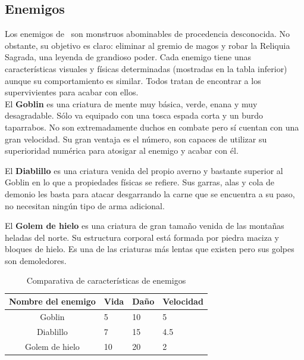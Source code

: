 \documentclass[a4paper,11pt]{article}
\begin{document}
\subsection{Enemigos}

Los enemigos de \juego\ son monstruos abominables de procedencia desconocida.
No obstante, su objetivo es claro: eliminar al gremio de magos y robar la
Reliquia Sagrada, una leyenda de grandioso poder. Cada enemigo tiene unas
características visuales y físicas determinadas (mostradas en la tabla inferior)
aunque su comportamiento es similar. Todos tratan de encontrar a los supervivientes
para acabar con ellos.\\

El \textbf{Goblin} es una criatura de mente muy básica, verde, enana y 
muy desagradable. Sólo va equipado con una tosca espada corta y un burdo
taparrabos. No son extremadamente duchos en combate pero sí cuentan con una
gran velocidad. Su gran ventaja es el número, son capaces de utilizar su
superioridad numérica para atosigar al enemigo y acabar con él. 


El \textbf{Diablillo} es una criatura venida del propio averno y bastante
superior al Goblin en lo que a propiedades físicas se refiere. Sus garras, alas
y cola de demonio les basta para atacar desgarrando la carne que se encuentra
a su paso, no necesitan ningún tipo de arma adicional.


El \textbf{Golem de hielo} es una criatura de gran tamaño venida de las
montañas heladas del norte. Su estructura corporal está formada por piedra
maciza y bloques de hielo. Es una de las criaturas más lentas que existen
pero sus golpes son demoledores.


\begin{table}[H]
  \label{caracteristicas-enemigos}
  \begin{center}
  \begin{tabular}{| c ||m{2cm}|m{2cm}|m{2cm}|}
    \hline
    Nombre del enemigo & Vida & Daño & Velocidad \\
    \hline
    Goblin & 5 & 10 & 5 \\
    \hline
    Diablillo & 7 & 15 & 4.5 \\
    \hline 
    Golem de hielo & 10 & 20 & 2 \\
    \hline
  \end{tabular}
\end{center}
\caption{Comparativa de características de enemigos}
\end{table}
\end{document}
